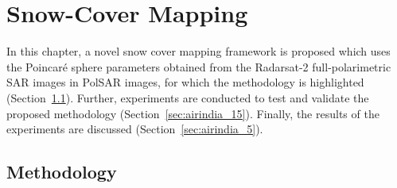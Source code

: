\chapter{Snow-Cover Mapping}
In this chapter, a novel snow cover mapping framework is proposed which uses the Poincar\'e sphere parameters obtained from the Radarsat-2 full-polarimetric SAR images in PolSAR images, for which the methodology is highlighted (Section~\ref{sec:airindia_515}). Further, experiments are conducted to test and validate the proposed methodology (Section~\ref{sec:airindia_15}). Finally, the results of the experiments are discussed (Section~\ref{sec:airindia_5}). 

\section{Methodology} 
\label{sec:airindia_515}


